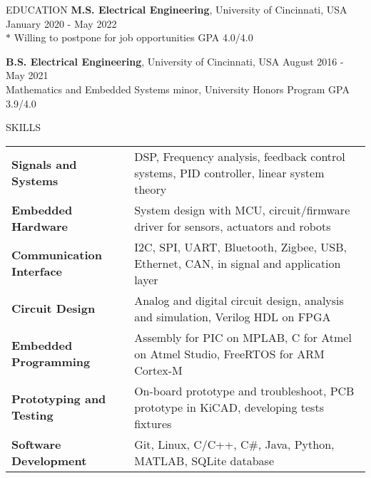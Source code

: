 \documentclass{../lib/resume} %
\begin{document}

    \begin{rSection}{EDUCATION}
        {\bf M.S. Electrical Engineering}, University of Cincinnati, USA \hfill {January 2020 - May 2022} \\
        $*$ Willing to postpone for job opportunities \hfill GPA 4.0/4.0 \smallskip

        {\bf B.S. Electrical Engineering}, University of Cincinnati, USA \hfill {August 2016 - May 2021}\\
        Mathematics and Embedded Systems minor, University Honors Program \hfill {GPA 3.9/4.0}




    \end{rSection}

    \begin{rSection}{SKILLS}

        \begin{tabular}{ @{} >{\bfseries}l @{\hspace{2ex}} l }
            Signals and Systems & DSP, Frequency analysis, feedback control systems, PID controller, linear system theory	\\
            Embedded Hardware       & System design with MCU, circuit/firmware driver for sensors, actuators and robots \\
            Communication Interface & I2C, SPI, UART, Bluetooth, Zigbee, USB, Ethernet, CAN, in signal and application layer \\
            Circuit Design & Analog and digital circuit design, analysis and simulation, Verilog HDL on FPGA \\
            Embedded Programming & Assembly for PIC on MPLAB, C for Atmel on Atmel Studio, FreeRTOS for ARM Cortex-M \\
            Prototyping and Testing &  On-board prototype and troubleshoot, PCB prototype in KiCAD, developing tests fixtures \\
            Software Development & Git, Linux, C/C++, C\#, Java, Python, MATLAB, SQLite database \\
        \end{tabular}
    \end{rSection}
\end{document}
